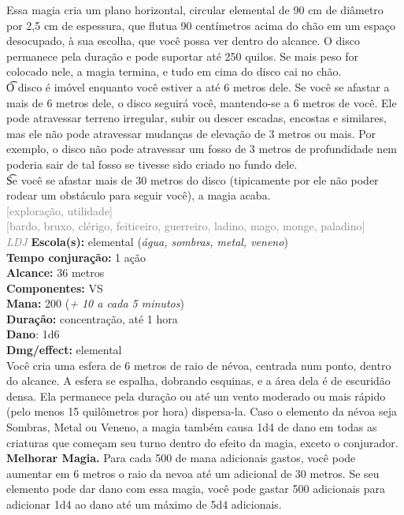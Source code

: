 \documentclass{RPG_Adventure}[2021/10/20]
\begin{document}
{\normalsize Essa magia cria um plano horizontal, circular elemental de 90 cm de diâmetro por 2,5 cm de espessura, que flutua 90 centímetros acima do chão em um espaço desocupado, à sua escolha, que você possa ver dentro do alcance. O disco permanece pela duração e pode suportar até 250 quilos. Se mais peso for colocado nele, a magia termina, e tudo em cima do disco cai no chão.\\\t O disco é imóvel enquanto você estiver a até 6 metros dele. Se você se afastar a mais de 6 metros dele, o disco seguirá você, mantendo-se a 6 metros de você. Ele pode atravessar terreno irregular, subir ou descer escadas, encostas e similares, mas ele não pode atravessar mudanças de elevação de 3 metros ou mais. Por exemplo, o disco não pode atravessar um fosso de 3 metros de profundidade nem poderia sair de tal fosso se tivesse sido criado no fundo dele.\\\t Se você se afastar mais de 30 metros do disco (tipicamente por ele não poder rodear um obstáculo para seguir você), a magia acaba.\\}
{\scriptsize \textcolor{gray}{[exploração, utilidade]\\}}
{\scriptsize \textcolor{gray}{[bardo, bruxo, clérigo, feiticeiro, guerreiro, ladino, mago, monge, paladino]\\}}
{\tiny \textcolor{gray}{\textit{LDJ}}}
{\small \t \textbf{Escola(s):} elemental (\textit{água, sombras, metal, veneno})\\\t \textbf{Tempo conjuração:} 1 ação\\\t \textbf{Alcance:} 36 metros\\\t \textbf{Componentes:} VS\\\t \textbf{Mana:} 200 (\textit{+ 10 a cada 5 minutos})\\\t \textbf{Duração:} concentração, até 1 hora\\\t \textbf{Dano}: 1d6\\\t \textbf{Dmg/effect:} elemental\\}
{\normalsize Você cria uma esfera de 6 metros de raio de névoa, centrada num ponto, dentro do alcance. A esfera se espalha, dobrando esquinas, e a área dela é de escuridão densa. Ela permanece pela duração ou até um vento moderado ou mais rápido (pelo menos 15 quilômetros por hora) dispersa-la. Caso o elemento da névoa seja Sombras, Metal ou Veneno, a magia também causa 1d4 de dano em todas as criaturas que começam seu turno dentro do efeito da magia, exceto o conjurador.\\\t \textbf{Melhorar Magia.} Para cada 500 de mana adicionais gastos, você pode aumentar em 6 metros o raio da nevoa até um adicional de 30 metros. Se seu elemento pode dar dano com essa magia, você pode gastar 500 adicionais para adicionar 1d4 ao dano até um máximo de 5d4 adicionais.\\}
\end{document}
